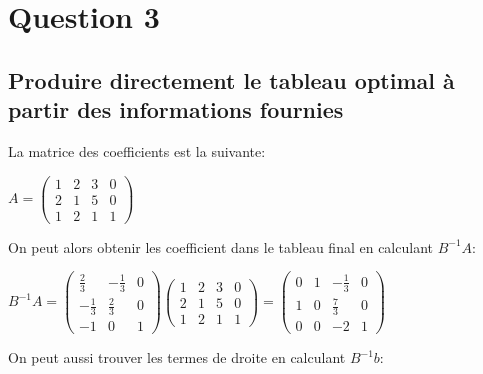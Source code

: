 \section*{Question 3}

\renewcommand{\theenumi}{\alph{enumi}}
\subsection{Produire directement le tableau optimal à partir des informations fournies}
	
La matrice des coefficients est la suivante:

\begin{center}
	\begin{math}
	A = 
	\begin{pmatrix}
		1 & 2 & 3 & 0 \\
		2 & 1 & 5 & 0 \\
		1 & 2 & 1 & 1
	\end{pmatrix}
	\end{math}
\end{center}

On peut alors obtenir les coefficient dans le tableau final en calculant $B^{-1}A$:
	
\begin{center}
	\begin{math}
	B^{-1}A =
	\begin{pmatrix}
		\frac{2}{3}  & -\frac{1}{3} & 0 \\[5pt]
		-\frac{1}{3} & \frac{2}{3}  & 0 \\[5pt]
		-1           & 0            & 1
	\end{pmatrix}
	\begin{pmatrix}
		1 & 2 & 3 & 0 \\[5pt]
		2 & 1 & 5 & 0 \\[5pt]
		1 & 2 & 1 & 1
	\end{pmatrix}
	=
	\begin{pmatrix}
		0 & 1 & -\frac{1}{3} & 0 \\[5pt]
		1 & 0 & \frac{7}{3}  & 0 \\[5pt]
		0 & 0 & -2           & 1
	\end{pmatrix}
	\end{math}
\end{center}

On peut aussi trouver les termes de droite en calculant $B^{-1}b$:

